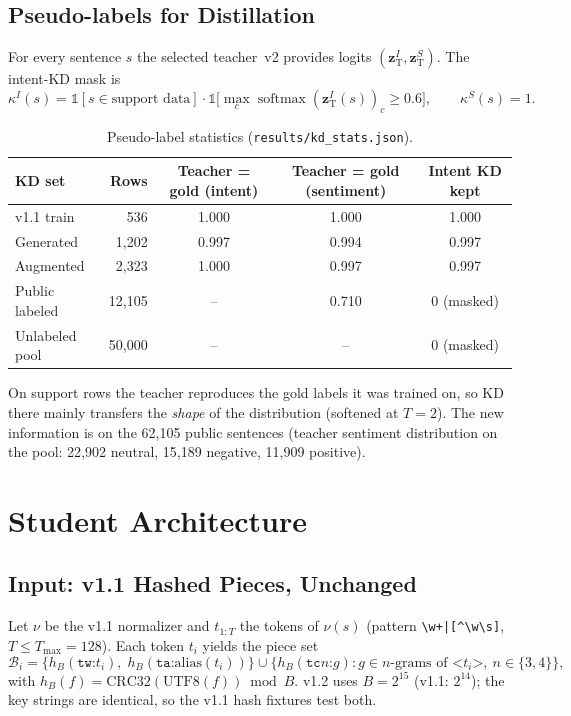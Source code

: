 \documentclass[11pt,a4paper]{article}
\theoremstyle{remark}
\newcommand{\z}{\bm{z}}
\DeclareMathOperator{\softmax}{softmax}
\begin{document}
\subsection{Pseudo-labels for Distillation}
For every sentence $s$ the selected teacher~v2 provides logits $(\z^{I}_{\text{T}}, \z^{S}_{\text{T}})$. The intent-KD mask is
\begin{equation}
  \kappa^I(s) = \mathbb{1}[s \in \text{support data}]\cdot\mathbb{1}\big[\max_c \softmax(\z^I_{\text{T}}(s))_c \ge 0.6\big],\qquad
  \kappa^S(s) = 1 .
\end{equation}
\begin{table}[h]
\centering\small
\caption{Pseudo-label statistics (\texttt{results/kd\_stats.json}).}
\label{tab:kd}
\begin{tabular}{@{}l r c c c@{}}
\toprule
KD set & Rows & Teacher = gold (intent) & Teacher = gold (sentiment) & Intent KD kept \\
\midrule
v1.1 train      & 536    & 1.000 & 1.000 & 1.000 \\
Generated       & 1{,}202 & 0.997 & 0.994 & 0.997 \\
Augmented       & 2{,}323 & 1.000 & 0.997 & 0.997 \\
Public labeled  & 12{,}105 & -- & 0.710 & 0 (masked) \\
Unlabeled pool  & 50{,}000 & -- & -- & 0 (masked) \\
\bottomrule
\end{tabular}
\end{table}
On support rows the teacher reproduces the gold labels it was trained on, so KD there mainly transfers the \emph{shape} of the distribution (softened at $T=2$). The new information is on the 62{,}105 public sentences (teacher sentiment distribution on the pool: 22{,}902 neutral, 15{,}189 negative, 11{,}909 positive).

\section{Student Architecture}
\label{sec:student}

\subsection{Input: v1.1 Hashed Pieces, Unchanged}
Let $\nu$ be the v1.1 normalizer and $t_{1:T}$ the tokens of $\nu(s)$ (pattern \verb!\w+|[^\w\s]!, $T\le T_{\max}=128$). Each token $t_i$ yields the piece set
\begin{equation}
  \mathcal{B}_i = \Big\{h_B(\texttt{tw:}t_i),\; h_B(\texttt{ta:}\mathrm{alias}(t_i))\Big\}\cup\Big\{h_B(\texttt{tc}n\texttt{:}g) : g \in \text{$n$-grams of } \texttt{<}t_i\texttt{>},\ n\in\{3,4\}\Big\},
\end{equation}
with $h_B(f)=\mathrm{CRC32}(\mathrm{UTF8}(f)) \bmod B$. v1.2 uses $B = 2^{15}$ (v1.1: $2^{14}$); the key strings are identical, so the v1.1 hash fixtures test both.
\end{document}
